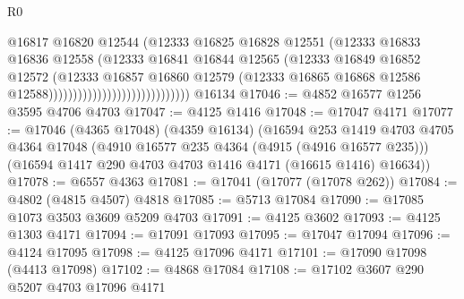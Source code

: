 \begin{lexlean}{R0}
\begin{coremodule}
                                                  @16817
                                                  @16820
                                                  @12544
                                                  (@12333
                                                    @16825
                                                    @16828
                                                    @12551
                                                    (@12333
                                                      @16833
                                                      @16836
                                                      @12558
                                                      (@12333
                                                        @16841
                                                        @16844
                                                        @12565
                                                        (@12333
                                                          @16849
                                                          @16852
                                                          @12572
                                                          (@12333
                                                            @16857
                                                            @16860
                                                            @12579
                                                            (@12333
                                                              @16865
                                                              @16868
                                                              @12586
                                                              @12588)))))))))))))))))))))))))))))
    @16134
@17046 := @4852 @16577 @1256 @3595 @4706 @4703
@17047 := @4125 @1416
@17048 := @17047 @4171
@17077 := @17046
    (@4365 @17048)
    (@4359 @16134)
    (@16594
      @253
      @1419
      @4703
      @4705
      @4364
      @17048
      (@4910 @16577 @235 @4364 (@4915 (@4916 @16577 @235)))
      (@16594 @1417 @290 @4703 @4703 @1416 @4171 (@16615 @1416) @16634))
@17078 := @6557 @4363
@17081 := @17041 (@17077 (@17078 @262))
@17084 := @4802 (@4815 @4507) @4818
@17085 := @5713 @17084
@17090 := @17085 @1073 @3503 @3609 @5209 @4703
@17091 := @4125 @3602
@17093 := @4125 @1303 @4171
@17094 := @17091 @17093
@17095 := @17047 @17094
@17096 := @4124 @17095
@17098 := @4125 @17096 @4171
@17101 := @17090 @17098 (@4413 @17098)
@17102 := @4868 @17084
@17108 := @17102 @3607 @290 @5207 @4703 @17096 @4171

\end{coremodule}
\end{lexlean}
